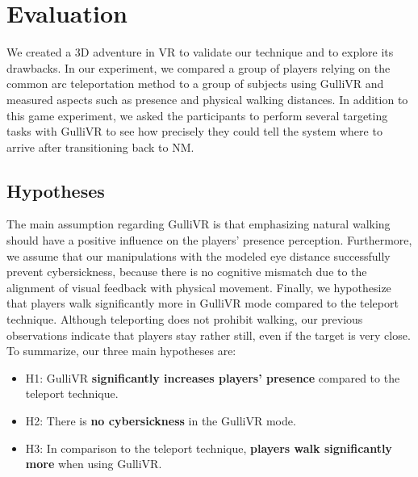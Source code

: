 \documentclass{sigchi}
\begin{document}





\section{Evaluation}

We created a 3D adventure in VR to validate our technique and to explore its drawbacks. In our experiment, we compared a group of players relying on the common arc teleportation method to a group of subjects using GulliVR and measured aspects such as presence and physical walking distances. In addition to this game experiment, we asked the participants to perform several targeting tasks with GulliVR to see how precisely they could tell the system where to arrive after transitioning back to NM.

\subsection{Hypotheses}

The main assumption regarding GulliVR is that emphasizing natural walking should have a positive influence on the players' presence perception. Furthermore, we assume that our manipulations with the modeled eye distance successfully prevent cybersickness, because there is no cognitive mismatch due to the alignment of visual feedback with physical movement. Finally, we hypothesize that players walk significantly more in GulliVR mode compared to the teleport technique. Although teleporting does not prohibit walking, our previous observations indicate that players stay rather still, even if the target is very close. To summarize, our three main hypotheses are:



\begin{itemize}
  \setlength{\itemsep}{2pt}
  \setlength{\parskip}{0pt}
  \setlength{\parsep}{0pt}
\item H1: GulliVR \textbf{significantly increases players' presence} compared to the teleport technique.
\item H2: There is \textbf{no cybersickness} in the GulliVR mode.
\item H3: In comparison to the teleport technique, \textbf{players walk significantly more} when using GulliVR.
\end{itemize}
\end{document}
